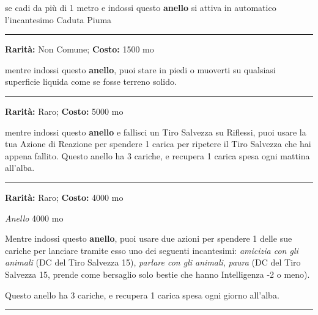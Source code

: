 \begin{multicols}{2}
se cadi da più di 1 metro e indossi questo \textbf{anello} si attiva in automatico l'incantesimo Caduta Piuma


\smallskip\noindent\rule{\linewidth}{2pt}  \hypertarget{AnellodiCamminaresull'Acqua}{}\medskip{}\noindent\label{AnellodiCamminaresull'Acqua}

\textbf{Rarità:} Non Comune; \textbf{Costo:} 1500 mo

mentre indossi questo \textbf{anello}, puoi stare in piedi o muoverti su qualsiasi superficie liquida come se fosse terreno solido.


\smallskip\noindent\rule{\linewidth}{2pt}  \hypertarget{AnellodiElusione}{}\medskip{}\noindent\label{AnellodiElusione}

\textbf{Rarità:} Raro; \textbf{Costo:} 5000 mo

mentre indossi questo \textbf{anello} e fallisci un Tiro Salvezza su Riflessi, puoi usare la tua Azione di Reazione per spendere 1 carica per ripetere il Tiro Salvezza che hai appena fallito. Questo anello ha 3 cariche, e recupera 1 carica spesa ogni mattina all'alba.

\smallskip\noindent\rule{\linewidth}{2pt}  \hypertarget{AnellodiInfluenzasugliAnimali}{}\medskip{}\noindent\label{AnellodiInfluenzasugliAnimali}

\textbf{Rarità:} Raro; \textbf{Costo:} 4000 mo

\emph{Anello} 4000 mo

Mentre indossi questo \textbf{anello}, puoi usare due azioni per spendere 1 delle sue cariche per lanciare tramite esso uno dei seguenti incantesimi: \emph{amicizia con gli animali} (DC del Tiro Salvezza 15), \emph{parlare con gli animali}, \emph{paura} (DC del Tiro Salvezza 15, prende come bersaglio solo bestie che hanno Intelligenza -2 o meno).

Questo anello ha 3 cariche, e recupera 1 carica spesa ogni giorno all'alba.

\smallskip\noindent\rule{\linewidth}{2pt}  \hypertarget{AnellodiInvisibilità}{}\medskip{}\noindent\label{AnellodiInvisibilità}


\end{multicols}
